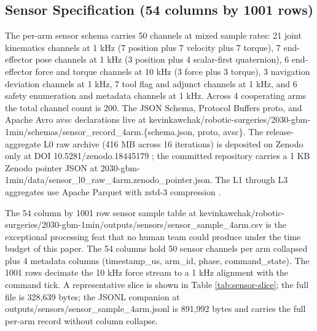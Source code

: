 \subsection{Sensor Specification (54 columns by 1001 rows)}
\label{sec:methods-sensors}

The per-arm sensor schema carries 50 channels at mixed sample rates:
21 joint kinematics channels at 1 kHz (7 position plus 7 velocity
plus 7 torque), 7 end-effector pose channels at 1 kHz (3 position
plus 4 scalar-first quaternion), 6 end-effector force and torque
channels at 10 kHz (3 force plus 3 torque), 3 navigation deviation
channels at 1 kHz, 7 tool flag and adjunct channels at 1 kHz, and 6
safety enumeration and metadata channels at 1 kHz. Across 4
cooperating arms the total channel count is 200. The JSON Schema,
Protocol Buffers proto, and Apache Avro avsc declarations live at
kevinkawchak/robotic-surgeries/2030-gbm-1min/schemas/sensor_record_4arm.\{schema.json, proto, avsc\}.
The release-aggregate L0 raw archive (416 MB across 16 iterations)
is deposited on Zenodo only at DOI 10.5281/zenodo.18445179
\cite{zenodo, repo-robotic-surgeries}; the committed repository
carries a 1 KB Zenodo pointer JSON at
2030-gbm-1min/data/sensor_l0_raw_4arm.zenodo_pointer.json. The L1
through L3 aggregates use Apache Parquet with zstd-3 compression
\cite{apache-arrow}.

The 54 column by 1001 row sensor sample table at
kevinkawchak/robotic-surgeries/2030-gbm-1min/outputs/sensors/sensor_sample_4arm.csv
is the exceptional processing feat that no human team could produce
under the time budget of this paper. The 54 columns hold 50 sensor
channels per arm collapsed plus 4 metadata columns (timestamp_us,
arm_id, phase, command_state). The 1001 rows decimate the 10 kHz
force stream to a 1 kHz alignment with the command tick. A
representative slice is shown in Table \ref{tab:sensor-slice}; the
full file is 328,639 bytes; the JSONL companion at
outputs/sensors/sensor_sample_4arm.jsonl is 891,992 bytes and
carries the full per-arm record without column collapse.

